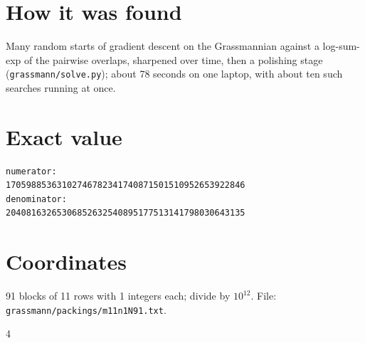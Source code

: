 \documentclass[11pt,a4paper]{article}
\begin{document}
\section{How it was found}
Many random starts of gradient descent on the Grassmannian against a log-sum-exp of the pairwise overlaps, sharpened over time, then a polishing stage (\texttt{grassmann/solve.py}); about 78 seconds on one laptop, with about ten such searches running at once.


\appendix
\section{Exact value}
{\small
\begin{verbatim}
numerator:
17059885363102746782341740871501510952653922846
denominator:
20408163265306852632540895177513141798030643135
\end{verbatim}}

\section{Coordinates}
91 blocks of 11 rows with 1 integers each; divide by $10^{12}$. File: \texttt{grassmann/packings/m11n1N91.txt}.
{\tiny
\begin{multicols}{4}
\end{multicols}}
\end{document}
